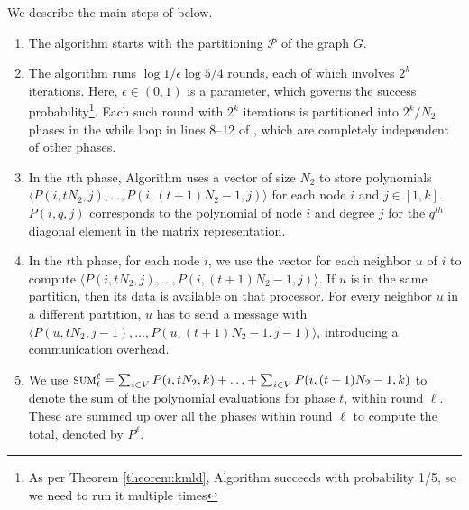 
We describe the main steps of \parmaxwt{} below.
\begin{enumerate}
\item
The algorithm starts with the partitioning $\mathcal{P}$ of the graph $G$.
\item
The algorithm runs $\log{1/\epsilon}\log{5/4}$ rounds, each of which involves $2^k$ iterations.
Here, $\epsilon\in(0, 1)$ is a parameter, which governs the success probability\footnote{As per Theorem \ref{theorem:kmld}, Algorithm \maxwt{} succeeds with probability 1/5, so we need to run it multiple times}. Each such round with $2^k$ iterations is partitioned into
$2^k/N_2$ phases in the while loop in lines 8--12 of \parmaxwt{}, which are completely independent of other phases.
\item
In the $t$th phase, Algorithm \parcircuitpath{} uses a vector of size $N_2$ to store polynomials
$\langle P(i, tN_2, j),\ldots, P(i, (t+1)N_2-1, j)\rangle$ for each node $i$ and $j \in [1,k]$. $P(i, q, j)$ corresponds to the polynomial of node $i$ and degree $j$ for the $q^{th}$ diagonal element in the matrix representation.
\item
In the $t$th phase, for each node $i$, we use the vector for each neighbor $u$ of $i$ to compute $\langle P(i, tN_2,j),\ldots, P(i, (t+1)N_2-1, j)\rangle$.
If $u$ is in the same partition, then its data is available on that processor. For every neighbor $u$ in a different partition, $u$ has to send a message with $\langle P(u, tN_2, j-1),\ldots, P(u, (t+1)N_2-1,j-1)\rangle$, introducing a communication overhead.
\item
We use $\textsc{sum}^{\ell}_t = \sum_{i\in V}P(i, tN_2, k) + \ldots + \sum_{i\in V} P(i, (t+1)N_2-1, k)$ 
to denote the sum of the polynomial evaluations for phase $t$, within round $\ell$. These are summed up over all the phases within round $\ell$ to compute the total, denoted by $P^{\ell}$.
\end{enumerate}

